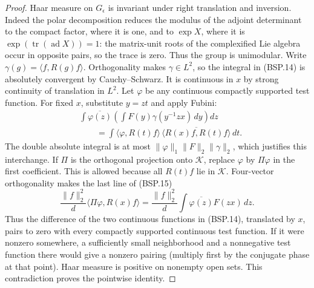 \documentclass[11pt,a4paper]{article}
\numberwithin{equation}{section}
\theoremstyle{remark}\newtheorem{remark}[theorem]{Remark}
\begin{document}
\begin{proof}
Haar measure on $G_\epsilon$ is invariant under right translation and
inversion.  Indeed the polar decomposition reduces the modulus of the
adjoint determinant to the compact factor, where it is one, and to
$\exp X$, where it is $\exp(\operatorname{tr}(\operatorname{ad}X))=1$:
the matrix-unit roots of the complexified Lie algebra occur in opposite
pairs, so the trace is zero.  Thus the group is unimodular.
Write $\gamma(g)=\langle f,R(g)f\rangle$.
Orthogonality makes $\gamma\in L^2$, so the integral in (BSP.14)
is absolutely convergent by Cauchy--Schwarz.  It is continuous in $x$
by strong continuity of translation in $L^2$.
Let $\varphi$ be any continuous compactly supported test function.
For fixed $x$, substitute $y=zt$ and apply Fubini:
\[
 \begin{split}
 &\int \overline{\varphi(z)}
       \left(\int F(y)\gamma(y^{-1}zx)\,dy\right)dz\\
 &\qquad=\int
       \langle\varphi,R(t)f\rangle\,
       \overline{\langle R(x)f,R(t)f\rangle}\,dt.
 \end{split}
 \tag{BSP.15}
\]
The double absolute integral is at most
$\|\varphi\|_1\|F\|_2\|\gamma\|_2$, which justifies this interchange.
If $\Pi$ is the orthogonal projection onto $\mathcal K$, replace
$\varphi$ by $\Pi\varphi$ in the first coefficient.  This is allowed
because all $R(t)f$ lie in $\mathcal K$.
Four-vector orthogonality makes the last line of (BSP.15)
\[
 \frac{\|f\|_2^2}{d}\langle\Pi\varphi,R(x)f\rangle
       =\frac{\|f\|_2^2}{d}
          \int\overline{\varphi(z)}F(zx)\,dz.
\]
Thus the difference of the two continuous functions in (BSP.14),
translated by $x$, pairs to zero with every compactly supported
continuous test function.  If it were nonzero somewhere, a sufficiently
small neighborhood and a nonnegative test function there would give
a nonzero pairing (multiply first by the conjugate phase at that
point).  Haar measure is positive on nonempty open sets.  This
contradiction proves the pointwise identity.
\end{proof}

\end{document}
